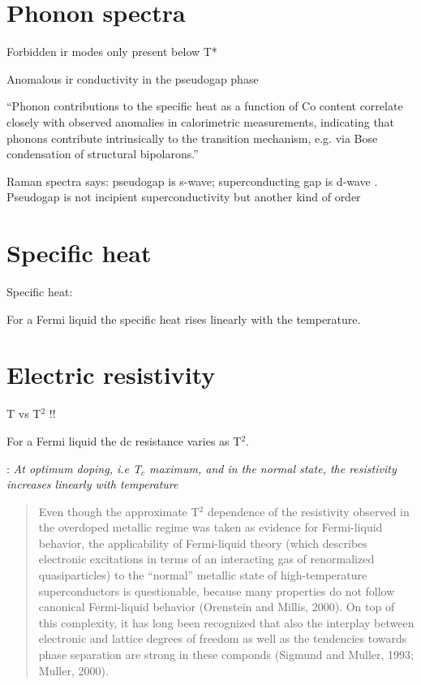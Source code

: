 \section{Phonon spectra}
\label{sec:phonon_spectra}

Forbidden ir modes only present below T* \cite{?}

Anomalous ir conductivity in the pseudogap phase \cite{Basov1996}

``Phonon contributions to the specific heat as a function of Co content correlate closely with observed anomalies in calorimetric measurements, indicating that phonons contribute intrinsically to the transition mechanism, e.g. via Bose condensation of structural bipolarons.'' \cite{Obhi1990} 

Raman spectra says: pseudogap is s-wave; superconducting gap is d-wave \cite{Sakai2013}.
Pseudogap is not incipient superconductivity but another kind of order \cite{He2011}

\section{Specific heat}
\label{sec:specific_heat}

Specific heat: \cite{Loram1993}

For a Fermi liquid the specific heat rises linearly with the temperature.

\section{Electric resistivity}
\label{sec:resistivity}

T vs T$^2$ \cite{Timusk1999}!!

For a Fermi liquid the dc resistance varies as T$^2$.

\cite{Muller2007}: \textit{At optimum doping, i.e T$_c$ maximum, and in the normal state, the resistivity increases linearly with temperature}

\cite{Damascelli2003}
\begin{quote}
Even though the approximate T$^2$ dependence of the resistivity observed in the overdoped metallic regime was taken as evidence for Fermi-liquid behavior, the applicability of Fermi-liquid theory (which describes electronic excitations in terms of an interacting gas of renormalized quasiparticles) to the ``normal'' metallic state of high-temperature superconductors is questionable, because many properties do not follow canonical Fermi-liquid behavior (Orenstein and Millis, 2000).
On top of this complexity, it has long been recognized that also the interplay between electronic and lattice degrees of freedom as well as the tendencies towards phase separation are strong in these componds (Sigmund and Muller, 1993; Muller, 2000). 
\end{quote}

